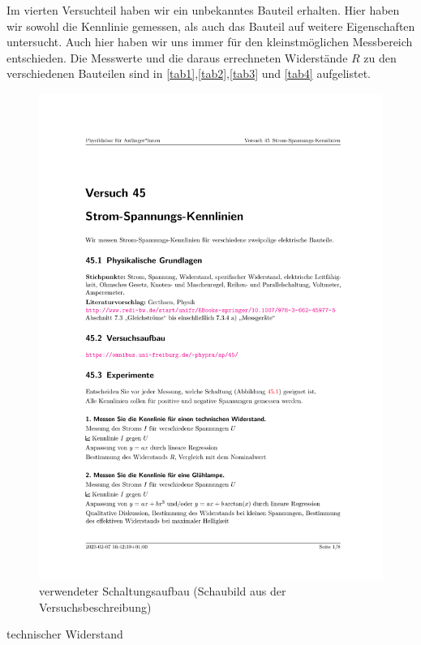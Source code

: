 \documentclass[parskip, 12pt, DIV=16, openany]{scrartcl}
\begin{document}
Im vierten Versuchteil haben wir ein unbekanntes Bauteil erhalten. Hier haben wir sowohl die Kennlinie gemessen, als auch das Bauteil auf weitere Eigenschaften untersucht. Auch hier haben wir uns immer für den kleinstmöglichen Messbereich entschieden. Die Messwerte und die daraus errechneten Widerstände $R$ zu den verschiedenen Bauteilen sind in \cref{tab1},\cref{tab2},\cref{tab3} und \cref{tab4} aufgelistet.
\begin{figure}
\centering
\includegraphics[page=2,trim=6cm 5.5cm 6cm 19.5cm,clip]{Versuch 45.pdf}
\caption{verwendeter Schaltungsaufbau (Schaubild aus der Versuchsbeschreibung)}\label{fig:schaltungen}
\end{figure}


\begin{table}
\begin{center}

\end{center}
\caption{technischer Widerstand}
\label{tab1}
\end{table}
\end{document}
